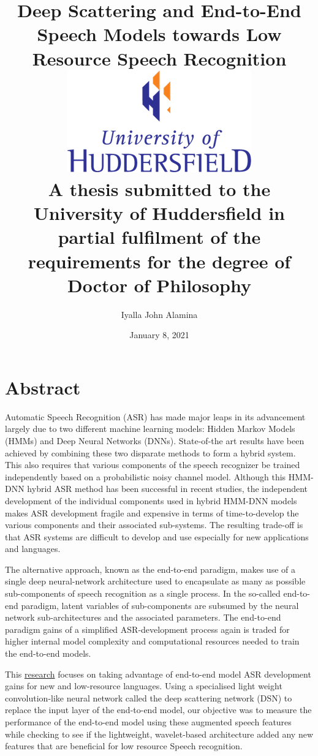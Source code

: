 \documentclass[12pt,twoside]{report}
\title{
    {Deep Scattering and End-to-End Speech Models towards Low Resource Speech Recognition}\\
    {\includegraphics{university.png}\\
A thesis submitted to the University of Huddersfield in partial fulfilment of the requirements for the degree of Doctor of Philosophy}
}
\author{Iyalla John Alamina}
\date{January 8, 2021}
\begin{document}
\makeglossaries


\maketitle
\DeclareRobustCommand{\startblue}{%
  \leavevmode
  \color{blue}
}
\DeclareRobustCommand{\stopblue}{%
  \normalcolor
}


\chapter*{Abstract}
\startblue
Automatic Speech Recognition (ASR) has made major leaps in its advancement largely due to two different machine learning models: Hidden Markov Models (HMMs) and Deep Neural Networks (DNNs).  State-of-the art results have been achieved by combining these two disparate methods to form a hybrid system.  This also requires that various components of the speech recognizer be trained independently based on a probabilistic noisy channel model.  Although this HMM-DNN hybrid ASR method has been successful in recent studies, the independent development of the individual components used in hybrid HMM-DNN models makes ASR development fragile and expensive in terms of time-to-develop the various components and their associated sub-systems.  The resulting trade-off is that ASR systems are difficult to develop and use especially for new applications and languages.

The alternative approach, known as the end-to-end paradigm, makes use of a single deep neural-network architecture used to encapsulate as many as possible sub-components of speech recognition as a single process.  In the so-called end-to-end paradigm, latent variables of sub-components are subsumed by the neural network sub-architectures and the associated parameters.  The end-to-end paradigm gains of a simplified ASR-development process again is traded for higher internal model complexity and computational resources needed to train the end-to-end models. 

This \href{https://docs.google.com/document/d/1ne2ctaxjpOlilMDg88aTtzOdIyP-wI2_ST5mGDvAYMw/edit?usp=sharing}{research} focuses on taking advantage of end-to-end model ASR development gains for new and low-resource languages. Using a specialised light weight convolution-like neural network called the deep scattering network (DSN) to replace the input layer of the end-to-end model, our objective was to measure the performance of the end-to-end model using these augmented speech features while checking to see if the lightweight, wavelet-based architecture added any new features that are beneficial for low resource Speech recognition. 
\end{document}
